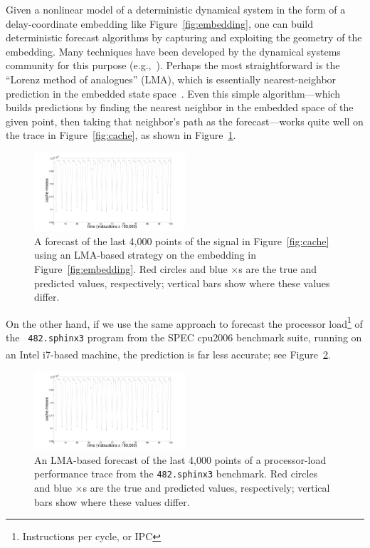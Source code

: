 \documentclass{article}
\begin{document}

Given a nonlinear model of a deterministic dynamical system in the
form of a delay-coordinate embedding like Figure~\ref{fig:embedding},
one can build deterministic forecast algorithms by capturing and
exploiting the geometry of the embedding.  Many techniques have been
developed by the dynamical systems community for this purpose
(e.g.,~\cite{casdagli-eubank92,weigend-book}).  Perhaps the most straightforward
is the ``Lorenz method of analogues'' (LMA), which is essentially
nearest-neighbor prediction in the embedded state
space~\cite{lorenz-analogues}.  Even this simple algorithm---which
builds predictions by finding the nearest neighbor in the embedded
space of the given point, then taking that neighbor's path as the
forecast---works quite well on the trace in Figure~\ref{fig:cache}, as
shown in Figure~\ref{fig:cachePredTS}.
%
\begin{figure}[htbp]
  \centering
    \includegraphics[width=0.5\textwidth]{figs/colCachePredTS}
    \caption{A forecast of the last 4,000 points of the signal in
      Figure~\ref{fig:cache} using an LMA-based strategy on the
      embedding in Figure~\ref{fig:embedding}.  Red circles and blue
      $\times$s are the true and predicted values, respectively;
      vertical bars show where these values differ. }
\label{fig:cachePredTS}
\end{figure}
%
On the other hand, if we use the same approach to forecast the
processor load\footnote{Instructions per cycle, or IPC} of the {\tt
  482.sphinx3} program from the SPEC cpu2006 benchmark suite, running
on an Intel i7\textsuperscript{\textregistered}-based machine, the
prediction is far less accurate; see Figure~\ref{fig:predsphinx}.
%
\begin{figure}[htbp]
  \centering
    \includegraphics[width=0.5\textwidth]{figs/sphinxPredicTS}
     \caption{An LMA-based forecast of the last 4,000 points of a
       processor-load performance trace from the {\tt 482.sphinx3}
       benchmark.  Red circles and blue $\times$s are the true and
       predicted values, respectively; vertical bars show where these
       values differ.}
\label{fig:predsphinx}
\end{figure}
\end{document}
